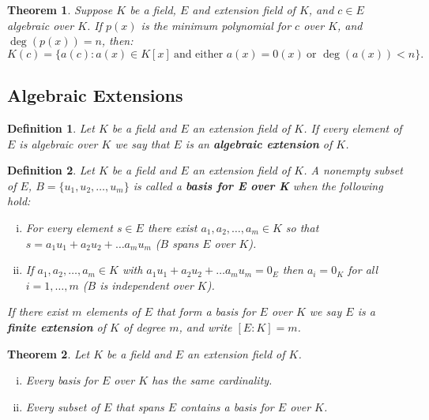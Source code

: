 \documentclass[letterpaper, 12pt]{article}
\newtheorem{defn}{Definition}
\newtheorem{thm}{Theorem}
\begin{document}
			\begin{thm}
			Suppose $K$ be a field, $E$ and extension field of $K$, and $c \in E$ algebraic over $K$.
			If $p(x)$ is the minimum polynomial for $c$ over $K$, and $\deg(p(x)) = n$, then: $$K(c) = \{ a(c) : a(x) \in K[x] \ \text{and either } a(x) = 0(x) \ \text{or } \deg(a(x)) < n \}.$$
			\end{thm}

		\subsection{Algebraic Extensions}
		\label{sec:algebraic_extensions}
			\setcounter{defn}{15}
			\begin{defn}
			Let $K$ be a field and $E$ an extension field of $K$.
			If every element of $E$ is algebraic over $K$ we say that $E$ is an \textbf{algebraic extension} of $K$.
			\end{defn}

			\begin{defn}
			Let $K$ be a field and $E$ an extension field of $K$.
			A nonempty subset of $E$, $B = \{ u_{1}, u_{2}, \dots, u_{m} \}$ is called a \textbf{basis for E over K} when the following hold:
				\begin{enumerate}[(i)]
				\item For every element $s \in E$ there exist $a_{1}, a_{2}, \dots, a_{m} \in K$ so that $s = a_{1}u_{1} + a_{2}u_{2} + \dots a_{m}u_{m}$ ($B$ spans $E$ over $K$).
				\item If $a_{1}, a_{2}, \dots, a_{m} \in K$ with $a_{1}u_{1} + a_{2}u_{2} + \dots a_{m}u_{m} = 0_{E}$ then $a_{i} = 0_{K}$ for all $i = 1, \dots, m$ ($B$ is independent over $K$).
				\end{enumerate}
				
			If there exist $m$ elements of $E$ that form a basis for $E$ over $K$ we say $E$ is a \textbf{finite extension} of $K$ of degree $m$, and write $[E:K] = m$.
			\end{defn}

			\setcounter{thm}{18}
			\begin{thm}
			Let $K$ be a field and $E$ an extension field of $K$.
				\begin{enumerate}[(i)]
				\item Every basis for $E$ over $K$ has the same cardinality.
				\item Every subset of $E$ that spans $E$ contains a basis for $E$ over $K$.
				\end{enumerate}
			\end{thm}
\end{document}
